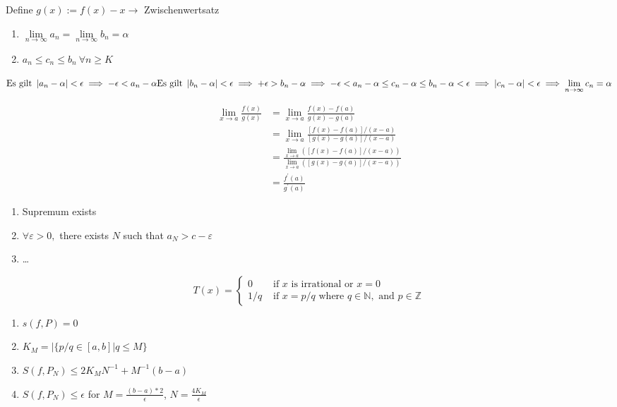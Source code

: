 \Beweis[Fixpunkt 6.4a] Define $g(x):=f(x)-x \rightarrow$ Zwischenwertsatz \\

\Beweis[Sandwich]
\begin{enumerate}
\item $\lim\limits_{n \rightarrow \infty} a_{n} = \lim\limits_{n \rightarrow \infty} b_{n} = \alpha$ 
\item $a_{n} \leq c_{n} \leq b_{n} \ \forall n \geq K$
\end{enumerate}

\(
\text{Es gilt } \left\lvert a_n - \alpha \right\rvert < \epsilon \implies - \epsilon < a_n - \alpha \\
\text{Es gilt } \left\lvert b_n - \alpha \right\rvert < \epsilon \implies + \epsilon > b_n - \alpha \\
\implies - \epsilon < a_n - \alpha \leq c_n - \alpha \leq b_n - \alpha < \epsilon \\
\implies \left\lvert c_n - \alpha \right\rvert < \epsilon \implies \lim\limits_{n \rightarrow \infty} c_{n} = \alpha
\) 

\Beweis[Hôpital]
\begin{align*}
\lim _{x \rightarrow a} \frac{f(x)}{g(x)} &=\lim _{x \rightarrow a} \frac{f(x)-f(a)}{g(x)-g(a)} \\
&=\lim _{x \rightarrow a} \frac{[f(x)-f(a)] /(x-a)}{[g(x)-g(a)] /(x-a)} \\
&=\frac{\lim _{x \rightarrow a}([f(x)-f(a)] /(x-a))}{\lim _{x \rightarrow a}([g(x)-g(a)] /(x-a))} \\
&=\frac{f^{\prime}(a)}{g^{\prime}(a)}
\end{align*}

\begin{enumerate}
\item Supremum exists
\item $\forall \varepsilon>0,$ there exists $N$ such that $a_{N}>c-\varepsilon$
\item \dots
\end{enumerate}

$$T(x)=\left\{\begin{array}{cl}0 & \text { if } x \text { is irrational or } x=0 \\ 1 / q & \text { if } x=p / q \text { where } q \in \mathbb{N}, \text { and } p \in \mathbb{Z}\end{array}\right.$$
\begin{enumerate}
\item $s(f, P) = 0$
\item $K_M = |\{p/q \in [a,b] | q \leq M \}$
\item $S(f,P_N) \leq 2K_M N^{-1}+M^{-1}(b-a)$
\item $S(f,P_N) \leq \epsilon$ for $M=\frac{(b-a)*2}{\epsilon}$, $N=\frac{4K_M}{\epsilon}$
\end{enumerate}


